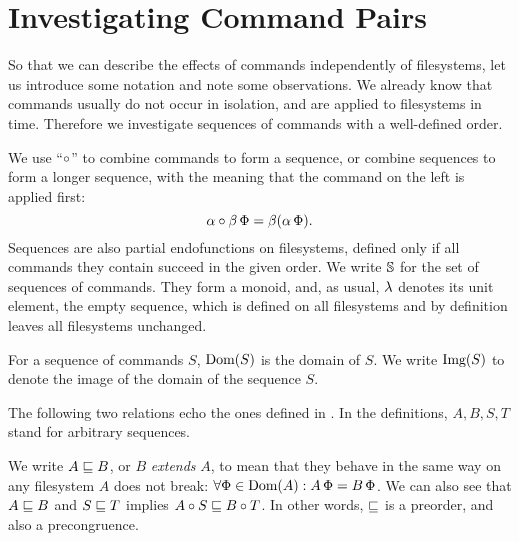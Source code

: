 

\section{Investigating Command Pairs}


So that we can describe the effects of commands independently of filesystems,
let us introduce some notation
and note some observations.
We already know that
commands usually do not occur in isolation,
and are applied to filesystems in time.
Therefore we investigate sequences of commands with a well-defined order.
\begin{mydef}
We use ``$\circ$'' to combine commands to form a sequence, or combine sequences to form a longer sequence,
with the meaning that the command on the left is applied first:
\[ \alpha\circ\beta\,\Phi = \beta(\alpha\,\Phi). \]
Sequences are also partial endofunctions on filesystems,
defined only if all commands they contain succeed in the given order.
We write $\mathbb{S}$ for the set of sequences of commands.
They form a monoid, and, as usual,
$\lambda$ denotes its unit element, the empty sequence,
which is defined on all filesystems and by definition leaves all filesystems unchanged.
\end{mydef}

\begin{mydef}
For a sequence of commands $S$, $\textrm{Dom}({S})$ is the domain of $S$.
We write $\textrm{Img}({S})$ to denote the image of the domain of the sequence $S$.
\end{mydef}


The following two relations 
echo the ones defined in \cite{NREC}.
In the definitions, $A,B,S,T$ stand for arbitrary sequences.

\begin{mydef}[$\eqext$]
We write $A\sqsubseteq B$, or $B$ \emph{extends} $A$,
to mean that they behave in the same way
on any filesystem $A$ does not break:
$\forall \Phi\in\textrm{Dom}({A}): A\,\Phi=B\,\Phi$.
We can also see that $A\sqsubseteq B$ and $S\sqsubseteq T$ implies $A\circ S\sqsubseteq B\circ T$.
In other words, $\eqext$ is a preorder, and also a precongruence.
\end{mydef}

